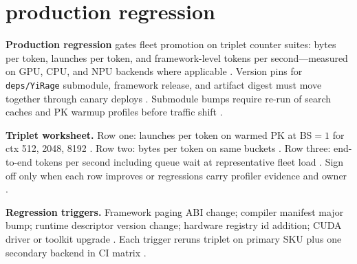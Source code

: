 \section{production regression}
\label{sec:ch30_production_regression}

\textbf{Production regression} gates fleet promotion on triplet counter suites: bytes per token, launches per token, and framework-level tokens per second---measured on GPU, CPU, and NPU backends where applicable \citep{yirage2026,chen2020compilerbasedhardw,patel2025llminference,taxbreak2026,memoryfloor2026,kwon2023vllm,liu2024deepseekv3,amd2024xdna,amd2024aie,semianalysis2024tma,dao2022flashattention,dao2023flashdecoding,nvidia2022hopper,nvidia2024cudagraphs,dlbook}. Version pins for \texttt{deps/YiRage} submodule, framework release, and artifact digest must move together through canary deploys \citep{yirage2026,chen2020compilerbasedhardw,patel2025llminference,kwon2023vllm,dlbook}. Submodule bumps require re-run of search caches and PK warmup profiles before traffic shift \citep{yirage2026,chen2020compilerbasedhardw,patel2025llminference,memoryfloor2026,taxbreak2026,dlbook}.

\textbf{Triplet worksheet.} Row one: launches per token on warmed PK at BS${=}1$ for ctx 512, 2048, 8192 \citep{taxbreak2026,yirage2026,patel2025llminference,kwon2023vllm,dlbook}. Row two: bytes per token on same buckets \citep{memoryfloor2026,patel2025llminference,yirage2026,chen2020compilerbasedhardw,dao2022flashattention,dlbook}. Row three: end-to-end tokens per second including queue wait at representative fleet load \citep{patel2025llminference,kwon2023vllm,yirage2026,chen2020compilerbasedhardw,dlbook}. Sign off only when each row improves or regressions carry profiler evidence and owner \citep{patel2025llminference,memoryfloor2026,yirage2026,chen2020compilerbasedhardw,taxbreak2026,dlbook}.

\textbf{Regression triggers.} Framework paging ABI change; compiler manifest major bump; runtime descriptor version change; hardware registry id addition; CUDA driver or toolkit upgrade \citep{kwon2023vllm,yirage2026,chen2020compilerbasedhardw,patel2025llminference,nvidia2024cudagraphs,semianalysis2024tma,dlbook,taxbreak2026,memoryfloor2026,amd2024xdna,amd2024aie,liu2024deepseekv3,dao2022flashattention,dao2023flashdecoding,nvidia2022hopper,dlbook}. Each trigger reruns triplet on primary SKU plus one secondary backend in CI matrix \citep{yirage2026,chen2020compilerbasedhardw,patel2025llminference,amd2024aie,amd2024xdna,dlbook,taxbreak2026,memoryfloor2026,kwon2023vllm,liu2024deepseekv3,nvidia2024cudagraphs,dao2022flashattention,semianalysis2024tma,dao2023flashdecoding,nvidia2022hopper,dlbook}.

